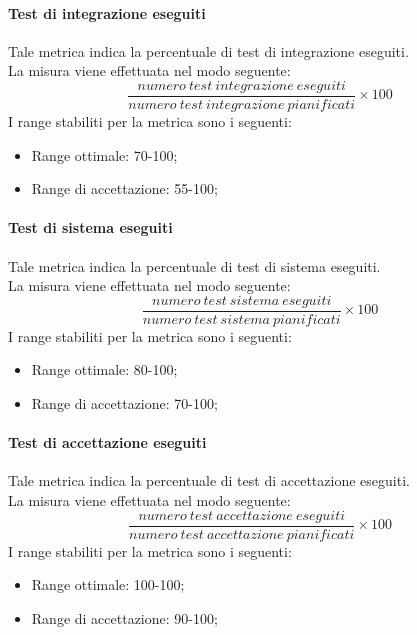 			\paragraph[Test di integrazione eseguiti]{\hypertarget{tie}{Test di integrazione eseguiti}}
				Tale metrica indica la percentuale di test di integrazione eseguiti.
			\\La misura viene effettuata nel modo seguente:
				\begin{equation}
					\frac{numero~test~integrazione~eseguiti}{numero~test~integrazione~pianificati}\times100
				\end{equation}
			I range stabiliti per la metrica sono i seguenti:
				\begin{itemize}
					\item Range ottimale: 70-100;
					\item Range di accettazione: 55-100;
				\end{itemize}
				
			\paragraph[Test di sistema eseguiti]{\hypertarget{tse}{Test di sistema eseguiti}}
			Tale metrica indica la percentuale di test di sistema eseguiti.
			\\La misura viene effettuata nel modo seguente:
				\begin{equation}
					\frac{numero~test~sistema~eseguiti}{numero~test~sistema~pianificati}\times100
				\end{equation}
			I range stabiliti per la metrica sono i seguenti:
				\begin{itemize}
					\item Range ottimale: 80-100;
					\item Range di accettazione: 70-100;
				\end{itemize}
				
			\paragraph[Test di accettazione eseguiti]{\hypertarget{tae}{Test di accettazione eseguiti}}
			Tale metrica indica la percentuale di test di accettazione eseguiti.
			\\La misura viene effettuata nel modo seguente:
				\begin{equation}
					\frac{numero~test~accettazione~eseguiti}{numero~test~accettazione~pianificati}\times100
				\end{equation}
			I range stabiliti per la metrica sono i seguenti:
				\begin{itemize}
					\item Range ottimale: 100-100;
					\item Range di accettazione: 90-100;
				\end{itemize}
			
